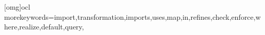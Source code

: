 [omg]{ocl}
{morekeywords={import,transformation,imports,uses,map,in,refines,check,enforce,where,realize,default,query},
}